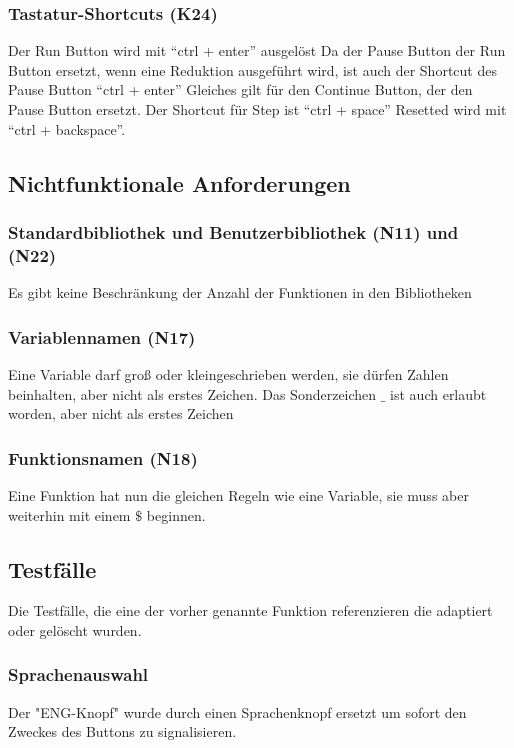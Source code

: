 \documentclass[parskip=full,11pt,twoside]{scrartcl}
\begin{document}
\subsubsection{Tastatur-Shortcuts (K24)} \label{w:k24}

Der Run Button wird mit \enquote{ctrl + enter} ausgelöst
Da der Pause Button der Run Button ersetzt, wenn eine Reduktion ausgeführt wird,
ist auch der Shortcut des Pause Button \enquote{ctrl + enter}
Gleiches gilt für den Continue Button, der den Pause Button ersetzt.
Der Shortcut für Step ist \enquote{ctrl + space}
Resetted wird mit \enquote{ctrl + backspace}.

\subsection{Nichtfunktionale Anforderungen}

\subsubsection{Standardbibliothek und Benutzerbibliothek (N11) und (N22)}
Es gibt keine Beschränkung der Anzahl der Funktionen in den Bibliotheken
\subsubsection{Variablennamen (N17)}
Eine Variable darf groß oder kleingeschrieben werden, sie dürfen Zahlen
beinhalten, aber nicht als erstes Zeichen.
Das Sonderzeichen $\_ $ ist auch erlaubt worden, aber nicht als erstes Zeichen 
\subsubsection{Funktionsnamen (N18)}
Eine Funktion hat nun die gleichen Regeln wie eine Variable, sie muss aber 
weiterhin mit einem $\$$ beginnen.



\subsection{Testfälle}
Die Testfälle, die eine der vorher genannte Funktion referenzieren die adaptiert oder
gelöscht wurden.

\subsubsection{Sprachenauswahl}
Der "ENG-Knopf" wurde durch einen Sprachenknopf ersetzt um sofort den Zweckes des Buttons
zu signalisieren.
\end{document}
